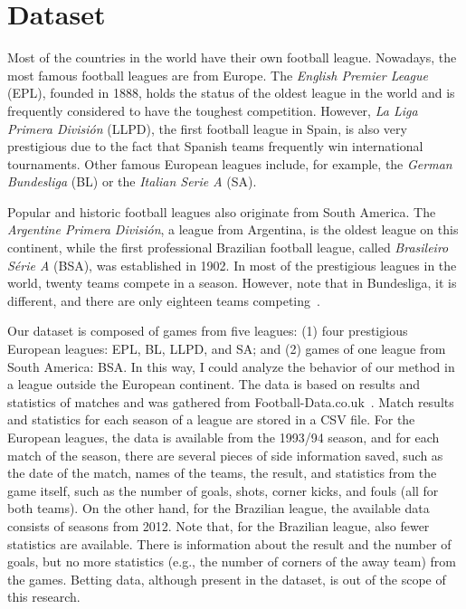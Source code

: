 \documentclass[thesis=M,english]{FITthesis}[2019/12/23]
\begin{document}
\section{Dataset}
\label{dataset}
Most of the countries in the world have their own football league. Nowadays, the most famous football leagues are from Europe. The \textit{English Premier League} (EPL), founded in 1888, holds the status of the oldest league in the world and is frequently considered to have the toughest competition. However, \textit{La Liga Primera División} (LLPD), the first football league in Spain, is also very prestigious due to the fact that Spanish teams frequently win international tournaments. Other famous European leagues include, for example, the \textit{German Bundesliga} (BL) or the \textit{Italian Serie A} (SA). 

Popular and historic football leagues also originate from South America. The \emph{Argentine Primera División}, a league from Argentina, is the oldest league on this continent, while the first professional Brazilian football league, called \textit{Brasileiro Série A} (BSA), was established in 1902. In most of the prestigious leagues in the world, twenty teams compete in a season. However, note that in Bundesliga, it is different, and there are only eighteen teams competing~\cite{leagues}.

Our dataset is composed of games from five leagues: (1) four prestigious European leagues: EPL, BL, LLPD, and SA; and (2) games of one league from South America: BSA. In this way, I could analyze the behavior of our method in a league outside the European continent. The data is based on results and statistics of matches and was gathered from Football-Data.co.uk~\cite{football_data}. Match results and statistics for each season of a league are stored in a CSV file. For the European leagues, the data is available from the 1993/94 season, and for each match of the season, there are several pieces of side information saved, such as the date of the match, names of the teams, the result, and statistics from the game itself, such as the number of goals, shots, corner kicks, and fouls (all for both teams). On the other hand, for the Brazilian league, the available data consists of seasons from 2012. Note that, for the Brazilian league, also fewer statistics are available. There is information about the result and the number of goals, but no more statistics (e.g., the number of corners of the away team) from the games. Betting data, although present in the dataset, is out of the scope of this research.
\end{document}
